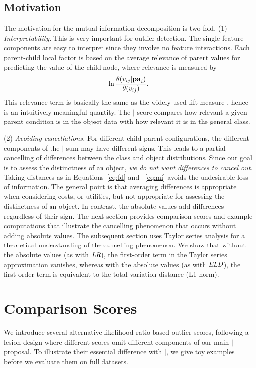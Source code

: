 {\subsection{Motivation} 

The motivation for the mutual information decomposition is two-fold. 
(1) {\em Interpretability.} This is very important for outlier detection. The single-feature components are easy to interpret since they involve no feature interactions. Each parent-child local factor is based on the average relevance of parent values for predicting the value of the child node, where relevance is measured by $$\ln \frac{\theta(v_{ij}|\mathbf{pa}_{i})}{\theta(v_{ij})}.$$ This relevance term  is basically the same as the widely used lift measure \cite{Tuffery2011}, hence is an intuitively meaningful quantity. The $\mid$ score compares how relevant a given parent condition is in the object data with how relevant it is in the general class. 


(2) {\em Avoiding cancellations.} 
For different child-parent configurations, the different components of the $\mid$ sum may have different signs. This leads to a partial cancelling of differences between the class and object distributions. Since our goal is to assess the distinctness of an object, {\em we do not want differences to cancel out.} Taking distances as in Equations~\eqref{eq:fd} and ~\eqref{eq:mi} avoids the undesirable loss of information. The general point is that averaging differences is appropriate when considering costs, or utilities, but not appropriate for assessing the distinctness of an object. In contrast, the absolute values add differences regardless of their sign. The next section provides comparison scores and example computations that illustrate the cancelling phenomenon that occurs without adding absolute values. The subsequent section uses Taylor series analysis for a theoretical understanding of the cancelling phenomenon: We show that without the absolute values (as with $\it{LR}$), the first-order term in the Taylor series approximation vanishes, whereas with the absolute values (as with $\it{ELD}$), the first-order term is equivalent to the total variation distance (L1 norm). 

\section{Comparison Scores} \label{sec:metrics}

We introduce several alternative likelihood-ratio based outlier scores, following a lesion design where different scores omit different components of our main $\mid$ proposal. %
To illustrate their essential difference with $\mid$, we give toy examples before we evaluate them on full datasets.

}
